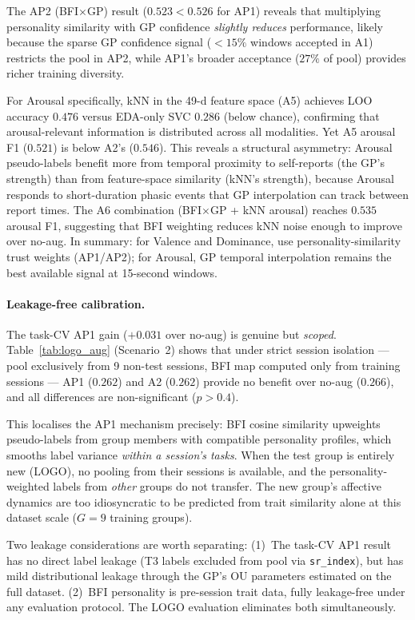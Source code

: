 \documentclass[sigconf,nonacm]{acmart}
\begin{document}
The AP2 (BFI$\times$GP) result ($0.523 < 0.526$ for AP1) reveals that multiplying
personality similarity with GP confidence \emph{slightly reduces} performance,
likely because the sparse GP confidence signal ($<15\%$ windows accepted in A1)
restricts the pool in AP2, while AP1's broader acceptance ($27\%$ of pool) provides
richer training diversity.

For Arousal specifically, kNN in the 49-d feature space (A5) achieves LOO
accuracy $0.476$ versus EDA-only SVC $0.286$ (below chance), confirming that
arousal-relevant information is distributed across all modalities.
Yet A5 arousal F1 ($0.521$) is below A2's ($0.546$).
This reveals a structural asymmetry: Arousal pseudo-labels benefit more from
temporal proximity to self-reports (the GP's strength) than from feature-space
similarity (kNN's strength), because Arousal responds to short-duration phasic
events that GP interpolation can track between report times.
The A6 combination (BFI$\times$GP + kNN arousal) reaches $0.535$ arousal F1,
suggesting that BFI weighting reduces kNN noise enough to improve over no-aug.
In summary: for Valence and Dominance, use personality-similarity trust weights
(AP1/AP2); for Arousal, GP temporal interpolation remains the best available
signal at 15-second windows.

\paragraph{Leakage-free calibration.}
The task-CV AP1 gain ($+0.031$ over no-aug) is genuine but \emph{scoped}.
Table~\ref{tab:logo_aug} (Scenario~2) shows that under strict session isolation
--- pool exclusively from 9 non-test sessions, BFI map computed only from
training sessions --- AP1 ($0.262$) and A2 ($0.262$) provide no benefit over
no-aug ($0.266$), and all differences are non-significant ($p > 0.4$).

This localises the AP1 mechanism precisely: BFI cosine similarity upweights
pseudo-labels from group members with compatible personality profiles, which
smooths label variance \emph{within a session's tasks}.
When the test group is entirely new (LOGO), no pooling from their sessions is
available, and the personality-weighted labels from \emph{other} groups do not
transfer.
The new group's affective dynamics are too idiosyncratic to be predicted from
trait similarity alone at this dataset scale ($G{=}9$ training groups).

Two leakage considerations are worth separating: (1)~The task-CV AP1 result has
no direct label leakage (T3 labels excluded from pool via \texttt{sr\_index}),
but has mild distributional leakage through the GP's OU parameters estimated
on the full dataset.
(2)~BFI personality is pre-session trait data, fully leakage-free under any
evaluation protocol.
The LOGO evaluation eliminates both simultaneously.
\end{document}
